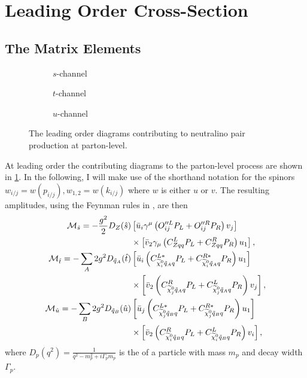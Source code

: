 \documentclass[../main.tex]{subfiles}
\begin{document}
\section{Leading Order Cross-Section}

\subsection{The Matrix Elements}
\begin{figure} [ht!]
	\centering
	\begin{subfigure}{0.3\linewidth}
		\centering
		\caption{\(s\)-channel}
	\end{subfigure}
	\begin{subfigure}{0.3\linewidth}
		\centering
		\caption{\(t\)-channel}
	\end{subfigure}
	\begin{subfigure}{0.3\linewidth}
		\centering
		\caption{\(u\)-channel}
	\end{subfigure}
	\caption{The leading order diagrams contributing to neutralino pair production at parton-level.}
	\label{fig:tree_level_diagrams}
\end{figure}

At leading order the contributing diagrams to the parton-level process are shown in \cref{fig:tree_level_diagrams}.
In the following, I will make use of the shorthand notation for the spinors \(w_{i/j} = w(p_{i/j}), w_{1,2} = w(k_{i/j})\) where \(w\) is either \(u\) or \(v\).
The resulting amplitudes, using the Feynman rules in , are then
\begin{subequations}
	\begin{align}
		\nonumber
		\M_{\hat{s}} = -\frac{g^2}{2} D_Z(\hat{s})           & \bclosed{ \bar{u}_i\gamma^\mu\pclosed{O^{\prime\prime L}_{ij}P_L + O^{\prime\prime R}_{ij}P_R} v_j }           \\
		                                                     & \times \bclosed{ \bar{v}_2 \gamma_\mu \pclosed{C^L_{Zqq}P_L + C^R_{Zqq}P_R} u_1 },                             \\
		\nonumber
		\M_{\hat{t}} = -\sum_A 2g^2 D_{\tilde{q}_A}(\hat{t}) & \bclosed{ \bar{u}_i \pclosed{C_{\nino[i]\tilde{q}_Aq}^{L\ast}P_L + C_{\nino[i]\tilde{q}_Aq}^{R\ast} P_R} u_1 } \\
		                                                     & \times \bclosed{ \bar{v}_2 \pclosed{C^R_{\nino[j]\tilde{q}_Aq}P_L + C^L_{\nino[j]\tilde{q}_Aq}P_R} v_j },      \\
		\nonumber
		\M_{\hat{u}} = -\sum_B 2g^2 D_{\tilde{q}_B}(\hat{u}) & \bclosed{ \bar{u}_j \pclosed{C_{\nino[j]\tilde{q}_Bq}^{L\ast}P_L + C_{\nino[j]\tilde{q}_Bq}^{R\ast} P_R} u_1 } \\
		                                                     & \times \bclosed{ \bar{v}_2 \pclosed{C^R_{\nino[i]\tilde{q}_Bq}P_L + C^L_{\nino[i]\tilde{q}_Bq}P_R} v_i },
	\end{align}
\end{subequations}
where \(D_p(q^2) = \frac{1}{q^2 - m_p^2 + i\Gamma_p m_p}\) is the  of a particle with mass \(m_p\) and decay width \(\Gamma_p\).
\end{document}
